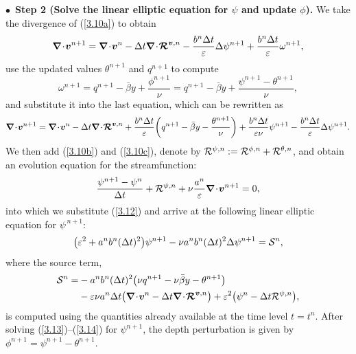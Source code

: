 \documentclass[a4paper,11pt,twoside]{article}
\numberwithin{equation}{section}
\numberwithin{figure}{section}
\numberwithin{table}{section}
\newcommand{\bnabla}{\bm{\nabla}}
\newcommand{\eps}{\varepsilon}
\newcommand{\dt}{\Delta t}
\newcommand{\bv}{\bm{v}}
\newcommand\eref[1]{(\ref{#1})}
\begin{document}
\smallskip
\noindent
$\bullet\,$ \textbf{Step 2 (Solve the linear elliptic equation for $\psi$ and update $\phi$).} We take the divergence of \eref{3.10a} to
obtain
\begin{equation*}
\bnabla\!\cdot\!\bv^{n+1}=\bnabla\!\cdot\!\bv^n-\dt\bnabla\!\cdot\!\bm{{\cal R}}^{\bv,n}-\frac{b^n\dt}{\eps}\Delta\psi^{n+1}
+\frac{b^n\dt}{\eps}\omega^{n+1},
\end{equation*}
use the updated values $\theta^{n+1}$ and $q^{n+1}$ to compute
$$
\omega^{n+1}=q^{n+1}-\bar{\beta}y+\frac{\phi^{n+1}}{\nu}=q^{n+1}-\bar{\beta}y+\frac{\psi^{n+1}-\theta^{n+1}}{\nu},
$$
and substitute it into the last equation, which can be rewritten as
\begin{equation}
\bnabla\!\cdot\!\bv^{n+1}=\bnabla\!\cdot\!\bv^n-\dt\bnabla\!\cdot\!\bm{{\cal R}}^{\bv,n}+\frac{b^n\dt}{\eps}\bigg(q^{n+1}-\bar{\beta}y-
\frac{\theta^{n+1}}{\nu}\bigg)+\frac{b^n\dt}{\eps\nu}\psi^{n+1}-\frac{b^n\dt}{\eps}\Delta\psi^{n+1}.
\label{3.12}
\end{equation}
We then add \eref{3.10b} and \eref{3.10c}, denote by ${\cal R}^{\psi,n}:={\cal R}^{\phi,n}+{\cal R}^{\theta,n}$, and obtain an evolution
equation for the streamfunction:
\begin{equation*}
\frac{\psi^{n+1}-\psi^n}{\dt}+{\cal R}^{\psi,n}+\nu\frac{a^n}{\eps}\bnabla\!\cdot\!\bv^{n+1}=0,
\end{equation*}
into which we substitute \eref{3.12} and arrive at the following linear elliptic equation for $\psi^{\,n+1}$:
\begin{equation}
\big(\eps^2+a^nb^n(\dt)^2\big)\psi^{n+1}-\nu a^nb^n(\dt)^2\Delta\psi^{n+1}={\cal S}^n,
\label{3.13}
\end{equation}
where the source term,
\begin{equation}
\begin{aligned}
{\cal S}^n=&-a^nb^n(\dt)^2\big(\nu q^{n+1}-\nu\bar{\beta}y-\theta^{n+1}\big)\\
&-\eps\nu a^n\dt\big(\bnabla\!\cdot\!\bv^n-\dt\bnabla\!\cdot\!\bm{{\cal R}}^{\bv,n}\big)+\eps^2\big(\psi^n-\dt{\cal R}^{\psi,n}\big),
\end{aligned}
\label{3.14}
\end{equation}
is computed using the quantities already available at the time level $t=t^n$. After solving \eref{3.13}--\eref{3.14} for $\psi^{n+1}$, the
depth perturbation is given by $\phi^{n+1}=\psi^{n+1}-\theta^{n+1}$.
\end{document}
